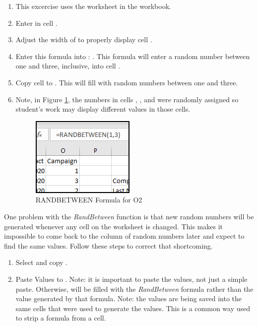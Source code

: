 \begin{enumerate}
	\item This excercise uses the  worksheet in the  workbook.
	\item Enter  in cell .
	\item Adjust the width of  to properly display cell .
	\item Enter this formula into : . This formula will enter a random number between one and three, inclusive, into cell .
	\item Copy cell  to . This will fill  with random numbers between one and three.
	\item Note, in Figure \ref{09:fig44}, the numbers in cells , , and  were randomly assigned so student's work may display different values in those cells.
	
	\begin{figure}[H]
		\centering
		\includegraphics[width=\maxwidth{.95\linewidth}]{gfx/ch09_fig44}
		\caption{RANDBETWEEN Formula for O2}
		\label{09:fig44}
	\end{figure}
	
\end{enumerate}
	
One problem with the \textit{RandBetween} function is that new random numbers will be generated whenever any cell on the worksheet is changed. This makes it impossible to come back to the column of random numbers later and expect to find the same values. Follow these steps to correct that shortcoming.

\begin{enumerate}[resume]
	\item Select and copy .
	\item Paste Values to . Note: it is important to paste the values, not just a simple paste. Otherwise,  will be filled with the \textit{RandBetween} formula rather than the value generated by that formula. Note: the values are being saved into the same cells that were used to generate the values. This is a common way used to strip a formula from a cell.
\end{enumerate}

